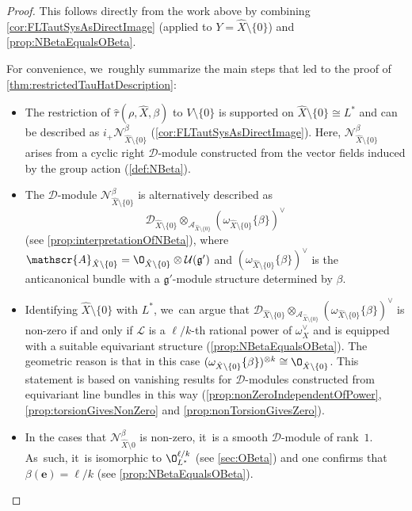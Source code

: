 \documentclass[JEP,XML,SOM,Unicode,published]{cedram}
\newcommand{\bme}{{\boldsymbol{e}}}
\newcommand{\cA}{\mathscr{A}}
\newcommand{\Ell}{\mathscr{L}}
\newcommand{\frg}{\mathfrak{g}}
\begin{document}
\begin{proof}
This follows directly from the work above by combining \cref{cor:FLTautSysAsDirectImage} (applied to $Y = \hat X \setminus \{0\}$) and \cref{prop:NBetaEqualsOBeta}.

For convenience, we~roughly summarize the main steps that led to the proof of \cref{thm:restrictedTauHatDescription}:

\begin{itemize}
\item The restriction of $\hat{\tau}(\rho, \hat{X}, \beta)$ to $V \setminus \{0\}$ is supported on $\hat X \setminus \{0\} \cong L^*$ and can be described as $i_+ \mathscr N_{\hat X \setminus \{0\}}^\beta$ (\cref{cor:FLTautSysAsDirectImage}). Here, $\mathscr N_{\hat X \setminus \{0\}}^\beta$ arises from a cyclic right $\mathscr D$\nobreakdash-mod\-ule constructed from the vector fields induced by the group action (\cref{def:NBeta}).
\item The $\mathscr D$\nobreakdash-mod\-ule $\mathscr N_{\hat X \setminus \{0\}}^\beta$ is alternatively described as
\[
\mathscr{D}_{\hat X \setminus \{0\}} \otimes_{\cA_{\hat X \setminus \{0\}}} (\omega_{\hat X \setminus \{0\}}\{\beta\})^\vee
\]
(see \cref{prop:interpretationOfNBeta}), where $\cA_{\hat X \setminus \{0\}} = \O_{\hat X \setminus \{0\}} \otimes \mathcal U(\frg')$ and $(\omega_{\hat X \setminus \{0\}}\{\beta\})^\vee$ is the anticanonical bundle with a $\frg'$\nobreakdash-mod\-ule structure determined by $\beta$.
\item Identifying $\hat X \setminus \{0\}$ with $L^*$, we~can argue that $\mathscr{D}_{\hat X \setminus \{0\}} \otimes_{\cA_{\hat X \setminus \{0\}}} (\omega_{\hat X \setminus \{0\}}\{\beta\})^\vee$ is non-zero if and only if $\Ell$ is a $\ell/k$-th rational power of $\omega_X^\vee$ and is equipped with a suitable equivariant structure (\cref{prop:NBetaEqualsOBeta}). The geometric reason is that in this case $(\omega_{\hat X \setminus \{0\}}\{\beta\})^{\otimes k} \cong \O_{\hat X \setminus \{0\}}$. This statement is based on vanishing results for $\mathscr D$\nobreakdash-mod\-ules constructed from equivariant line bundles in this way (\cref{prop:nonZeroIndependentOfPower}, \cref{prop:torsionGivesNonZero} and \cref{prop:nonTorsionGivesZero}).
\item In the cases that $\mathscr N_{\hat X \setminus 0}^\beta$ is non-zero, it~is a smooth $\mathscr D$\nobreakdash-mod\-ule of rank~$1$. As~such, it~is isomorphic to $\O_{L^*}^{\ell/k}$ (see \cref{sec:OBeta}) and one confirms that $\beta(\bme) = \ell/k$ (see \cref{prop:NBetaEqualsOBeta}). \qedhere
\end{itemize}
\end{proof}
\end{document}
